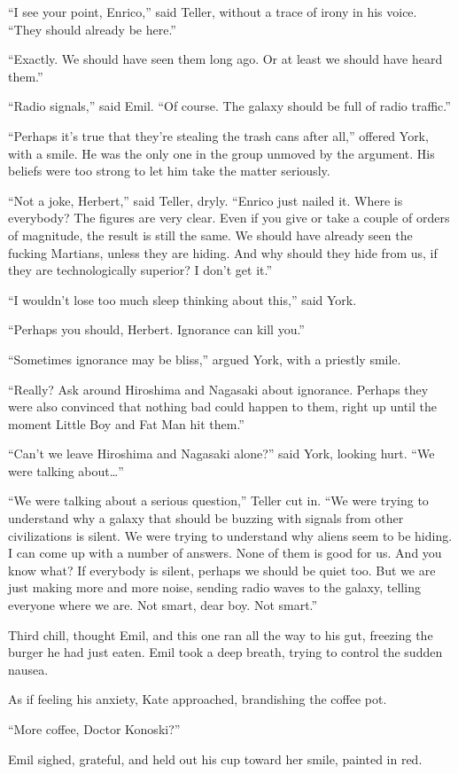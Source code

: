 \documentclass[11pt,a4paper]{article}
\begin{document}
“I see your point, Enrico,” said Teller, without a trace of irony in his voice. “They should already be here.”

“Exactly. We should have seen them long ago. Or at least we should have heard them.”

“Radio signals,” said Emil. “Of course. The galaxy should be full of radio traffic.”

“Perhaps it’s true that they’re stealing the trash cans after all,” offered York, with a smile. He was the only one in the group unmoved by the argument. His beliefs were too strong to let him take the matter seriously.

“Not a joke, Herbert,” said Teller, dryly. “Enrico just nailed it. Where is everybody? The figures are very clear. Even if you give or take a couple of orders of magnitude, the result is still the same. We should have already seen the fucking Martians, unless they are hiding. And why should they hide from us, if they are technologically superior? I don’t get it.”

“I wouldn’t lose too much sleep thinking about this,” said York.

“Perhaps you should, Herbert. Ignorance can kill you.”

“Sometimes ignorance may be bliss,” argued York, with a priestly smile.

“Really? Ask around Hiroshima and Nagasaki about ignorance. Perhaps they were also convinced that nothing bad could happen to them, right up until the moment Little Boy and Fat Man hit them.”

“Can’t we leave Hiroshima and Nagasaki alone?” said York, looking hurt. “We were talking about…”

“We were talking about a serious question,” Teller cut in. “We were trying to understand why a galaxy that should be buzzing with signals from other civilizations is silent. We were trying to understand why aliens seem to be hiding. I can come up with a number of answers. None of them is good for us. And you know what? If everybody is silent, perhaps we should be quiet too. But we are just making more and more noise, sending radio waves to the galaxy, telling everyone where we are. Not smart, dear boy. Not smart.”

Third chill, thought Emil, and this one ran all the way to his gut, freezing the burger he had just eaten. Emil took a deep breath, trying to control the sudden nausea.

As if feeling his anxiety, Kate approached, brandishing the coffee pot.

“More coffee, Doctor Konoski?”

Emil sighed, grateful, and held out his cup toward her smile, painted in red.
\end{document}
